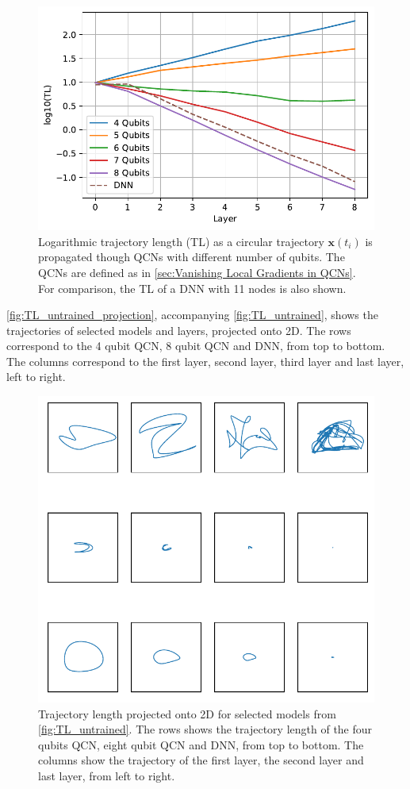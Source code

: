 \begin{figure}[H]
    \centering
    \includegraphics[width=12cm]{latex/figures/TL_untrained.pdf}
    \caption{Logarithmic trajectory length (TL) as a circular trajectory $\boldsymbol{x}(t_i)$ is propagated though QCNs with different number of qubits. The QCNs are defined as in \autoref{sec:Vanishing Local Gradients in QCNs}. For comparison, the TL of a DNN with 11 nodes is also shown.}
    \label{fig:TL_untrained}
\end{figure}

\autoref{fig:TL_untrained_projection}, accompanying \autoref{fig:TL_untrained}, shows the trajectories of selected models and layers, projected onto 2D. The rows correspond to the 4 qubit QCN, 8 qubit QCN and DNN, from top to bottom. The columns correspond to the first layer, second layer, third layer and last layer, left to right.   

\begin{figure}[H]
    \centering
    \includegraphics[width=12cm]{latex/figures/TL_untrained_projection.pdf}
    \caption{Trajectory length projected onto 2D for selected models from \autoref{fig:TL_untrained}. The rows shows the trajectory length of the four qubits QCN, eight qubit QCN and DNN, from top to bottom. The columns show the trajectory of the first layer, the second layer and last layer, from left to right.}
    \label{fig:TL_untrained_projection}
\end{figure}

